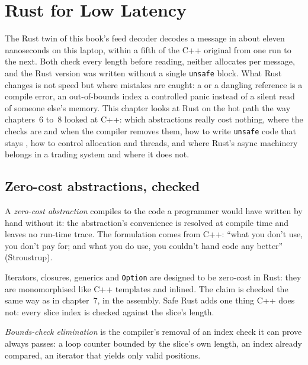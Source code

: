 \chapter{Rust for Low Latency}\label{ch:ll:rust-for-low-latency}

The Rust twin of this book's feed decoder decodes a message in about eleven nanoseconds on this laptop, within a fifth
of the C++ original from one run to the next. Both check every length before reading, neither allocates per message, and the
Rust version was written without a single \texttt{unsafe} block. What Rust changes is not speed but where mistakes are
caught: a  or a dangling reference is a compile error, an out-of-bounds index a controlled panic instead of a
silent read of someone else's memory. This chapter looks at Rust on the hot path the way chapters~6 to~8 looked at
C++: which abstractions really cost nothing, where the checks are and when the compiler removes them, how to write
\texttt{unsafe} code that stays , how to control allocation and threads, and where Rust's async machinery belongs
in a trading system and where it does not.

\section{Zero-cost abstractions, checked}

\begin{definition}\label{def:ll:rust-for-low-latency:zero}
A \emph{zero-cost abstraction} compiles to the code a programmer would have written by hand
without it: the abstraction's convenience is resolved at compile time and leaves no run-time trace. The formulation comes
from C++: ``what you don't use, you don't pay for; and what you do use, you couldn't hand code any better''
(Stroustrup).
\end{definition}

Iterators, closures, generics and \texttt{Option} are designed to be zero-cost in Rust: they are monomorphised like C++
templates and inlined. The claim is checked the same way as in chapter~7, in the assembly. Safe Rust adds one thing C++
does not: every slice index is checked against the slice's length.

\begin{definition}\label{def:ll:rust-for-low-latency:bce}
\emph{Bounds-check elimination} is the compiler's removal of an index check it can prove
always passes: a loop counter bounded by the slice's own length, an index already compared, an iterator that yields only
valid positions.
\end{definition}

